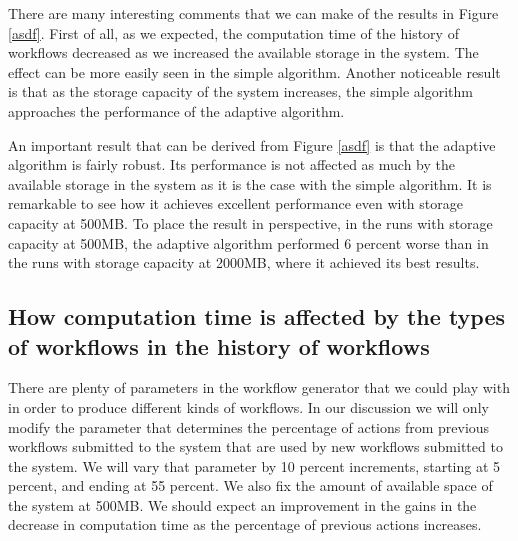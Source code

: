 There are many interesting comments that we can make of the results in Figure \ref{asdf}.  First of all, as we expected, the computation time of the history of workflows decreased as we increased the available storage in the system.  The effect can be more easily seen in the simple algorithm.  Another noticeable result is that as the storage capacity of the system increases, the simple algorithm approaches the performance of the adaptive algorithm.

An important result that can be derived from Figure \ref{asdf} is that the adaptive algorithm is fairly robust. Its performance is not affected as much by the available storage in the system as it is the case with the simple algorithm. It is remarkable to see how it achieves excellent performance even with storage capacity at 500MB.  To place the result in perspective, in the runs with storage capacity at 500MB, the adaptive algorithm performed 6 percent worse than in the runs with storage capacity at 2000MB, where it achieved its best results.

\subsection{How computation time is affected by the types of workflows in the history of workflows}
There are plenty of parameters in the workflow generator that we could play with in order to produce different kinds of workflows.  In our discussion we will only modify the parameter that determines the percentage of actions from previous workflows submitted to the system that are used by new workflows submitted to the system.  We will vary that parameter by 10 percent increments, starting at 5 percent, and ending at 55 percent.  We also fix the amount of available space of the system at 500MB.  We should expect an improvement in the gains in the decrease in computation time as the percentage of previous actions increases.








